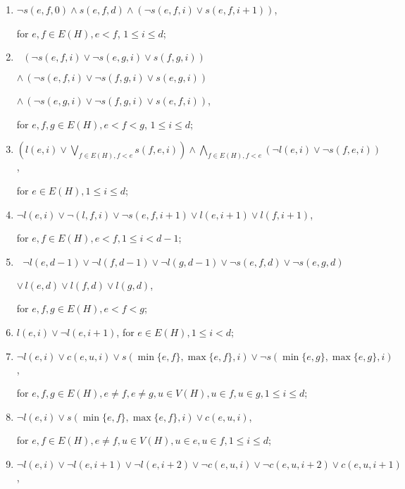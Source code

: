 \begin{enumerate}
	\item $\neg s(e,f,0) \land s(e,f,d) \land (\neg s(e,f,i) \lor s(e,f,i+1))$,
	 
	for $e,f \in E(H), e<f$, $1 \leq i \leq d$;
	
	\item $\ \ \, (\neg s(e,f,i) \lor \neg s(e,g,i) \lor s(f,g,i))$ \vspace{-4pt}
	
	$\land \, (\neg s(e,f,i) \lor \neg s(f,g,i) \lor s(e,g,i))$ \vspace{-4pt}
	
	$\land \, (\neg s(e,g,i) \lor \neg s(f,g,i) \lor s(e,f,i))$,
	
	for $e,f,g \in E(H), e < f < g$, $1 \leq i \leq d$;
	
	\item $(l(e,i) \lor \bigvee_{f\in E(H), f<e} s(f,e,i)) \land \bigwedge_{f\in E(H), f<e} (\neg l(e,i) \lor \neg s(f,e,i))$,
	
	for $e \in E(H), 1 \leq i \leq d$;
	
	\item $\neg l(e,i) \lor \neg(l,f,i) \lor \neg s(e,f,i+1) \lor l(e,i+1) \lor l(f,i+1)$,
	
	for $e,f \in E(H), e < f, 1 \leq i < d-1$;
	
	\item $\ \ \, \neg l(e,d-1) \lor \neg l(f,d-1) \lor \neg l(g,d-1) \lor \neg s(e,f,d) \lor \neg s(e,g,d)$ \vspace{-4pt}
	
	$\lor\, l(e,d) \lor l(f,d) \lor l(g,d)$,
	
	for $e,f,g \in E(H), e < f < g$;
	
	\item $l(e,i) \lor \neg l(e, i+1)$, for $e \in E(H), 1 \leq i < d$;
	\item $\neg l(e,i) \lor c(e,u,i) \lor s(\min\{e,f\}, \max\{e,f\}, i) \lor \neg s(\min\{e,g\}, \max\{e,g\}, i)$,
	
	for $e,f,g \in E(H), e\neq f, e\neq g, u \in V(H), u \in f, u \in g, 1 \leq i \leq d$;
	
	\item $\neg l(e,i) \lor s(\min\{e,f\}, \max\{e,f\}, i) \lor c(e,u,i)$,
	
	for $e,f \in E(H), e \neq f, u \in V(H), u \in e, u \in f, 1 \leq i \leq d$;
	
	\item $\neg l(e,i) \lor \neg l(e,i+1) \lor \neg l(e,i+2) \lor \neg c(e,u,i) \lor \neg c(e,u,i+2) \lor c(e,u,i+1)$,
	

\end{enumerate}
